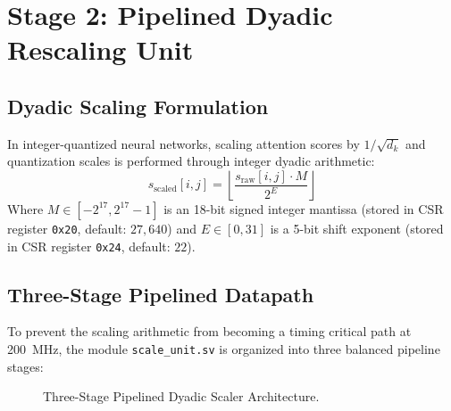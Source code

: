 \chapter{Stage 2: Pipelined Dyadic Rescaling Unit}
\label{chap:stage2_scaler}

\section{Dyadic Scaling Formulation}
In integer-quantized neural networks, scaling attention scores by $1/\sqrt{d_k}$ and quantization scales is performed through integer dyadic arithmetic:
\begin{equation}
    s_{\text{scaled}}[i, j] = \left\lfloor \frac{s_{\text{raw}}[i, j] \cdot M}{2^E} \right\rfloor
\end{equation}
Where $M \in [-2^{17}, 2^{17}-1]$ is an 18-bit signed integer mantissa (stored in CSR register \texttt{0x20}, default: $27,640$) and $E \in [0, 31]$ is a 5-bit shift exponent (stored in CSR register \texttt{0x24}, default: $22$).

\section{Three-Stage Pipelined Datapath}
To prevent the scaling arithmetic from becoming a timing critical path at 200~MHz, the module \texttt{scale\_unit.sv} is organized into three balanced pipeline stages:

\begin{figure}[htbp]
    \centering
    \caption{Three-Stage Pipelined Dyadic Scaler Architecture.}
    \label{fig:scaler_pipeline}
\end{figure}

